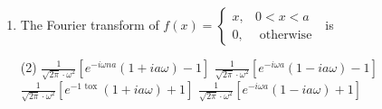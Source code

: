 \begin{enumerate}
\begin{tasks}
	\end{tasks}
	\item The Fourier transform of $f(x)= \begin{cases}x, & 0<x<a \\ 0, & \text { otherwise }\end{cases}$ is
	 \begin{tasks}(2)
		\task[\textbf{a.}]$\frac{1}{\sqrt{2 \pi} \cdot \omega^{2}}\left[e^{-i \omega n a}(1+i a \omega)-1\right]$
		\task[\textbf{b.}]$\frac{1}{\sqrt{2 \pi} \cdot \omega^{2}}\left[e^{-i \omega a}(1-i a \omega)-1\right]$
		\task[\textbf{c.}] $\frac{1}{\sqrt{2 \pi} \cdot \omega^{2}}\left[e^{-1 \text { tox }}(1+i a \omega)+1\right]$
		\task[\textbf{d.}] $\frac{1}{\sqrt{2 \pi} \cdot \omega^{2}}\left[e^{-i \omega a}(1-i a \omega)+1\right]$
	\end{tasks}
	
	
	
	
	
	
\end{enumerate}
